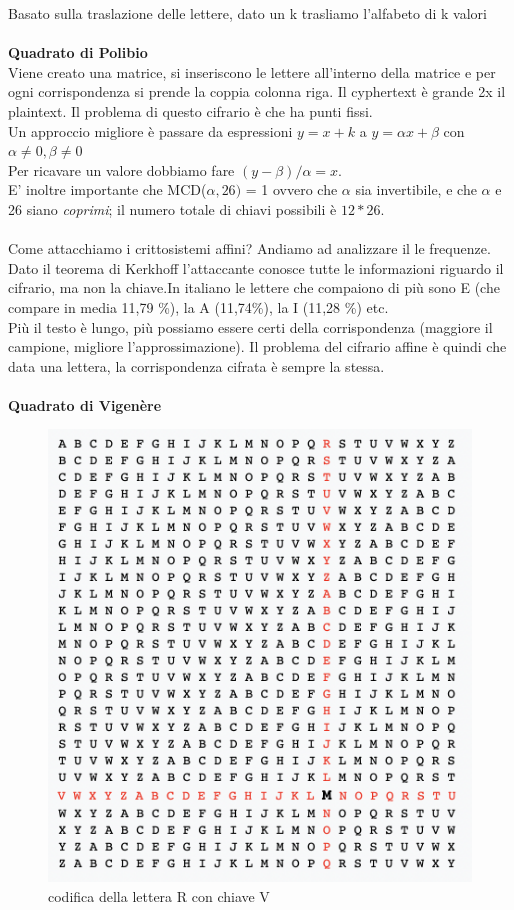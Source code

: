 \documentclass[11pt, oneside]{article}   	%
\begin{document}
Basato sulla traslazione delle lettere, dato un k trasliamo l'alfabeto di k valori\\\\
\textbf{Quadrato di Polibio} \\
Viene creato una matrice, si inseriscono le lettere all'interno della matrice e per ogni corrispondenza si prende la coppia colonna riga. Il cyphertext è grande 2x il plaintext. Il problema di questo cifrario è che ha punti fissi. \\
Un approccio migliore è passare da espressioni \(y = x + k \) a \(y = \alpha x + \beta \) con \(\alpha \neq 0   , \beta \neq 0 \)\\Per ricavare un valore dobbiamo fare \((y-\beta)/\alpha = x\). \\E' inoltre importante che MCD($\alpha, 26)$ = 1 ovvero che $\alpha$ sia invertibile, e che $\alpha$ e 26 siano \emph{coprimi}; il numero totale di chiavi possibili è $12 * 26$.\\\\
Come attacchiamo i crittosistemi affini? Andiamo ad analizzare il le frequenze. \\Dato il teorema di Kerkhoff l'attaccante conosce tutte le informazioni riguardo il cifrario, ma non la chiave.In italiano le lettere che compaiono di più sono E (che compare in media 11,79 \%), la A (11,74\%), la I (11,28 \%) etc.\\ Più il testo è lungo, più possiamo essere certi della corrispondenza (maggiore il campione, migliore l'approssimazione). Il problema del cifrario affine è quindi che data una lettera, la corrispondenza cifrata è sempre la stessa.\\\\
\textbf{Quadrato di Vigenère}
\begin{figure} [H]
\begin{center}
\includegraphics[scale=0.4]{vig}
\caption{codifica della lettera R con chiave V}
\end{center}
\end{figure}
\end{document}
